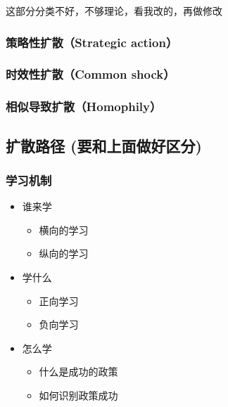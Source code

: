 \documentclass[
  12pt,
]{ctexart}
\begin{document}
这部分分类不好，不够理论，看我改的，再做修改

\hypertarget{ux7b56ux7565ux6027ux6269ux6563strategic-action}{%
\subsubsection{策略性扩散（Strategic action）}\label{ux7b56ux7565ux6027ux6269ux6563strategic-action}}

\hypertarget{ux65f6ux6548ux6027ux6269ux6563common-shock}{%
\subsubsection{时效性扩散（Common shock）}\label{ux65f6ux6548ux6027ux6269ux6563common-shock}}

\hypertarget{ux76f8ux4f3cux5bfcux81f4ux6269ux6563homophily}{%
\subsubsection{相似导致扩散（Homophily）}\label{ux76f8ux4f3cux5bfcux81f4ux6269ux6563homophily}}

\hypertarget{ux6269ux6563ux8defux5f84-ux8981ux548cux4e0aux9762ux505aux597dux533aux5206}{%
\subsection{扩散路径 (要和上面做好区分)}\label{ux6269ux6563ux8defux5f84-ux8981ux548cux4e0aux9762ux505aux597dux533aux5206}}

\hypertarget{ux5b66ux4e60ux673aux5236}{%
\subsubsection{学习机制}\label{ux5b66ux4e60ux673aux5236}}

\begin{itemize}
\item
  谁来学

  \begin{itemize}
  \item
    横向的学习
  \item
    纵向的学习
  \end{itemize}
\item
  学什么

  \begin{itemize}
  \item
    正向学习
  \item
    负向学习
  \end{itemize}
\item
  怎么学

  \begin{itemize}
  \item
    什么是成功的政策
  \item
    如何识别政策成功
  \end{itemize}
\end{itemize}
\end{document}
